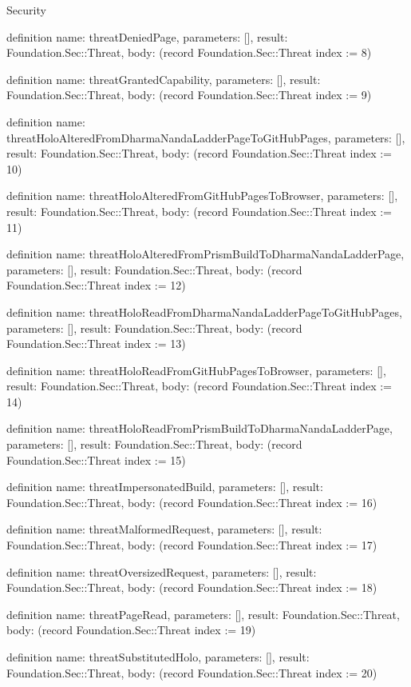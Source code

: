 \begin{lexlean}{Security}
\begin{semanticmodule}
definition{
  name: threatDeniedPage,
  parameters: [],
  result: Foundation.Sec::Threat,
  body: (record Foundation.Sec::Threat {index := 8})
}

definition{
  name: threatGrantedCapability,
  parameters: [],
  result: Foundation.Sec::Threat,
  body: (record Foundation.Sec::Threat {index := 9})
}

definition{
  name: threatHoloAlteredFromDharmaNandaLadderPageToGitHubPages,
  parameters: [],
  result: Foundation.Sec::Threat,
  body: (record Foundation.Sec::Threat {index := 10})
}

definition{
  name: threatHoloAlteredFromGitHubPagesToBrowser,
  parameters: [],
  result: Foundation.Sec::Threat,
  body: (record Foundation.Sec::Threat {index := 11})
}

definition{
  name: threatHoloAlteredFromPrismBuildToDharmaNandaLadderPage,
  parameters: [],
  result: Foundation.Sec::Threat,
  body: (record Foundation.Sec::Threat {index := 12})
}

definition{
  name: threatHoloReadFromDharmaNandaLadderPageToGitHubPages,
  parameters: [],
  result: Foundation.Sec::Threat,
  body: (record Foundation.Sec::Threat {index := 13})
}

definition{
  name: threatHoloReadFromGitHubPagesToBrowser,
  parameters: [],
  result: Foundation.Sec::Threat,
  body: (record Foundation.Sec::Threat {index := 14})
}

definition{
  name: threatHoloReadFromPrismBuildToDharmaNandaLadderPage,
  parameters: [],
  result: Foundation.Sec::Threat,
  body: (record Foundation.Sec::Threat {index := 15})
}

definition{
  name: threatImpersonatedBuild,
  parameters: [],
  result: Foundation.Sec::Threat,
  body: (record Foundation.Sec::Threat {index := 16})
}

definition{
  name: threatMalformedRequest,
  parameters: [],
  result: Foundation.Sec::Threat,
  body: (record Foundation.Sec::Threat {index := 17})
}

definition{
  name: threatOversizedRequest,
  parameters: [],
  result: Foundation.Sec::Threat,
  body: (record Foundation.Sec::Threat {index := 18})
}

definition{
  name: threatPageRead,
  parameters: [],
  result: Foundation.Sec::Threat,
  body: (record Foundation.Sec::Threat {index := 19})
}

definition{
  name: threatSubstitutedHolo,
  parameters: [],
  result: Foundation.Sec::Threat,
  body: (record Foundation.Sec::Threat {index := 20})
}


\end{semanticmodule}
\end{lexlean}
